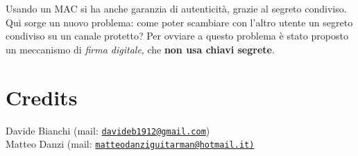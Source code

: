 \documentclass[a4paper, 11pt]{article}
\newcommand{\mail}[1]{\href{mailto:#1}{\texttt{#1}}}
\begin{document}
\begin{multicols}{2}
		Usando un MAC si ha anche garanzia di autenticità, grazie al segreto condiviso. Qui sorge un nuovo problema: come poter scambiare con l'altro utente un segreto condiviso su un canale protetto? Per ovviare a questo problema è stato proposto un meccanismo di \textit{firma digitale}, che \textbf{non usa chiavi segrete}.
		
		
		
		
		
		
	
	
	
	
	
	
	
	
	
	
	
	
	
	\end{multicols}

	\section{Credits}
	Davide Bianchi (mail: \mail{davideb1912@gmail.com}) \\
	Matteo Danzi (mail: \mail{matteodanziguitarman@hotmail.it)}
	
\end{document}
